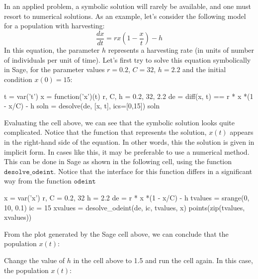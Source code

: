\documentclass{ximera}
\begin{document}
In an applied problem, a symbolic solution will rarely be available, and one must resort to numerical solutions. As an example, let's consider the following model for a population with harvesting:
\[
\frac{dx}{dt}=rx\left(1-\frac{x}{t}\right)-h
\]
In this equation, the parameter $h$ represents a harvesting rate (in units of number of individuals per unit of time). Let's first try to solve this equation symbolically in Sage, for the parameter values $r=0.2$, $C=32$, $h=2.2$ and  the initial condition $x(0)=15$:

\begin{sageCell}
t = var('t')
x = function('x')(t)
r, C, h = 0.2, 32, 2.2
de = diff(x, t) == r * x *(1 - x/C) - h
soln = desolve(de, [x, t], ics=[0,15])
soln
\end{sageCell}

Evaluating the cell above, we can see that the symbolic solution looks quite complicated. Notice that the function that represents the solution, $x(t)$ appears in the right-hand side of the equation. In other words, this the solution is given in implicit form. In cases like this, it may be preferable to use a numerical method. This can be done in Sage as shown in the following cell, using the function $\mathtt{desolve\_odeint}$. Notice that the interface for this function differs in a significant way from the function $\mathtt{odeint}$

\begin{sageCell}
x = var('x')
r, C = 0.2, 32
h = 2.2
de = r * x *(1 - x/C) - h
tvalues = srange(0, 10, 0.1)
ic = 15
xvalues = desolve_odeint(de, ic, tvalues, x)
points(zip(tvalues, xvalues))
\end{sageCell}

\begin{problem} From the plot generated by the Sage cell above, we can conclude that the population $x(t)$:
\begin{multipleChoice}
\end{multipleChoice}
\end{problem}

\begin{problem} 
Change the value of $h$ in the cell above to 1.5 and run the cell again. In this case, the population $x(t)$:
\begin{multipleChoice}
\end{multipleChoice}
\end{problem}
\end{document}

